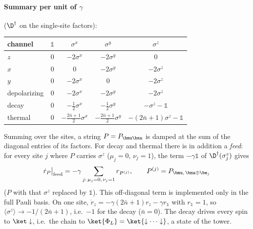 \paragraph{Summary per unit of $\gamma$} ($\D^\dagger$ on the single-site factors):
\begin{center}
\small
\begin{tabular}{lcccc}
\toprule
channel & $\mathds 1$ & $\sigma^x$ & $\sigma^y$ & $\sigma^z$ \\
\midrule
$z$ & $0$ & $-2\sigma^x$ & $-2\sigma^y$ & $0$ \\
$x$ & $0$ & $0$ & $-2\sigma^y$ & $-2\sigma^z$ \\
$y$ & $0$ & $-2\sigma^x$ & $0$ & $-2\sigma^z$ \\
depolarizing & $0$ & $-2\sigma^x$ & $-2\sigma^y$ & $-2\sigma^z$ \\
decay & $0$ & $-\tfrac12\sigma^x$ & $-\tfrac12\sigma^y$ & $-\sigma^z - \mathds 1$ \\
thermal & $0$ & $-\tfrac{2\bar n+1}2\sigma^x$ & $-\tfrac{2\bar n+1}2\sigma^y$ & $-(2\bar n+1)\sigma^z - \mathds 1$ \\
\bottomrule
\end{tabular}
\end{center}
Summing over the sites, a string $P = P_{\bmu\bnu}$ is damped at the sum of the diagonal entries of its factors. For decay and thermal there is in addition a \emph{feed}: for every site $j$ where $P$ carries $\sigma^z$ ($\mu_j = 0$, $\nu_j = 1$), the term $-\gamma\mathds 1$ of $\D^\dagger(\sigma^z_j)$ gives
\begin{equation}
\dot r_P\big|_{\mathrm{feed}} = -\gamma\sum_{j:\,\mu_j = 0,\,\nu_j = 1} r_{P^{(j)}}, \qquad P^{(j)} = P_{\bmu,\,\bnu\oplus\be_j}
\end{equation}
($P$ with that $\sigma^z$ replaced by $\mathds 1$). This off-diagonal term is implemented only in the full Pauli basis. On one site, $\dot r_z = -\gamma(2\bar n+1)r_z - \gamma r_{\mathds 1}$ with $r_{\mathds 1} = 1$, so $\langle\sigma^z\rangle \to -1/(2\bar n+1)$, i.e.\ $-1$ for the decay ($\bar n = 0$). The decay drives every spin to $\ket\downarrow$, i.e.\ the chain to $\ket{\Phi_L} = \ket{\downarrow\cdots\downarrow}$, a state of the tower.


